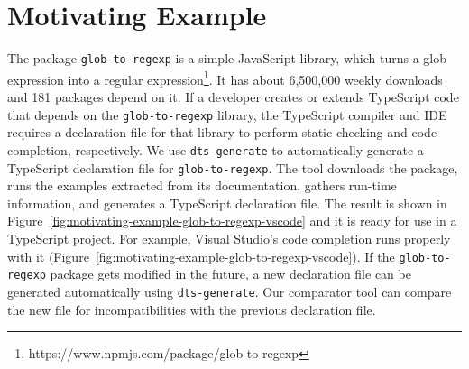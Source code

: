 \documentclass[english,cleveref,autoref,submission]{programming}
\newcommand{\figref}[1]{Figure~\ref{#1}}
\begin{document}
\section{Motivating Example}
\label{sec:motivating-example}
The \NPM{} package \texttt{glob-to-regexp} is a simple JavaScript library, which turns a glob expression into a regular expression\footnote{https://www.npmjs.com/package/glob-to-regexp}. It
has about 6,500,000 weekly downloads and 181 \NPM{} packages depend on it. If
a developer creates or extends TypeScript code that depends on the
\texttt{glob-to-regexp} library, the TypeScript
compiler and IDE requires a declaration file for that library to
perform static checking and code completion, respectively. We 
use \texttt{dts-generate} to automatically generate a TypeScript
declaration file for \texttt{glob-to-regexp}. The tool downloads the \NPM{} 
package, runs the examples extracted from its documentation, gathers
run-time information, and generates a TypeScript declaration
file. The result is 
shown in \figref{fig:motivating-example-glob-to-regexp-vscode} and it is
ready for use in a TypeScript project. For example,  Visual Studio's
code completion runs properly with it
(\figref{fig:motivating-example-glob-to-regexp-vscode}). If the
\texttt{glob-to-regexp} package gets modified in the future, a new declaration
file can be generated automatically using
\texttt{dts-generate}. Our comparator tool can compare the new file
for incompatibilities with the previous declaration file.
\end{document}
